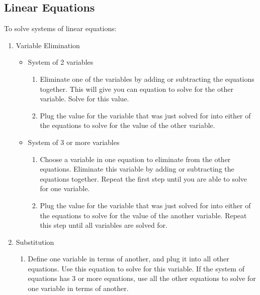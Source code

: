 \documentclass[a4paper,12pt]{article}
\theoremstyle{definition}
\theoremstyle{definition}
\begin{document}
	\subsection{Linear Equations}
	To solve systems of linear equations:
	\begin{enumerate}
		\item Variable Elimination
		\begin{itemize}
			\item System of 2 variables
			\begin{enumerate}
				\item Eliminate one of the variables by adding or subtracting the equations together. This will give you can equation to solve for the other variable. Solve for this value.
				\item Plug the value for the variable that was just solved for into either of the equations to solve for the value of the other variable.
			\end{enumerate}
			\item System of 3 or more variables
			\begin{enumerate}
				\item Choose a variable in one equation to eliminate from the other equations. Eliminate this variable by adding or subtracting the equations together. Repeat the first step until you are able to solve for one variable.
				\item Plug the value for the variable that was just solved for into either of the equations to solve for the value of the another variable. Repeat this step until all variables are solved for.
			\end{enumerate}
		\end{itemize}
		\item Substitution
		\begin{enumerate}
			\item Define one variable in terms of another, and plug it into all other equations. Use this equation to solve for this variable. If the system of equations has 3 or more equations, use all the other equations to solve for one variable in terms of another.
		\end{enumerate}
	\end{enumerate}
\end{document}
